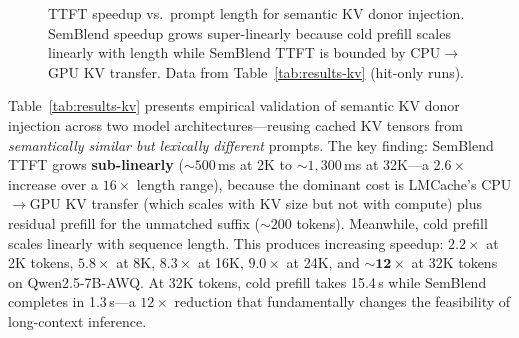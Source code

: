 \documentclass[10pt,twocolumn]{article}
\begin{document}
\begin{figure}[t]
\centering
{}
\caption{TTFT speedup vs.\ prompt length for semantic KV donor injection.
SemBlend speedup grows super-linearly because cold prefill scales linearly
with length while SemBlend TTFT is bounded by CPU$\to$GPU KV transfer.
Data from Table~\ref{tab:results-kv} (hit-only runs).}
\label{fig:speedup-curve}
\end{figure}

Table~\ref{tab:results-kv} presents empirical validation of semantic
KV donor injection across two model architectures---reusing cached KV
tensors from \emph{semantically similar but lexically different} prompts.
The key finding: SemBlend TTFT grows \textbf{sub-linearly}
(${\sim}500$\,ms at 2K to ${\sim}1{,}300$\,ms at 32K---a $2.6\times$
increase over a $16\times$ length range), because the dominant cost is
LMCache's CPU$\to$GPU KV transfer (which scales with KV size but not
with compute) plus residual prefill for the unmatched suffix
(${\sim}200$ tokens). Meanwhile, cold prefill scales linearly with
sequence length.
This produces increasing speedup: $2.2\times$ at 2K tokens,
$5.8\times$ at 8K, $8.3\times$ at 16K, $9.0\times$ at 24K, and
$\mathbf{{\sim}12\times}$ at 32K tokens on Qwen2.5-7B-AWQ.
At 32K tokens, cold prefill takes 15.4\,s while SemBlend completes
in 1.3\,s---a $12\times$ reduction that fundamentally changes the
feasibility of long-context inference.
\end{document}
